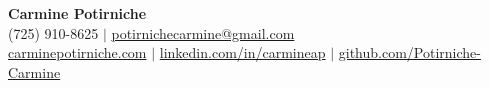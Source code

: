 \documentclass[letterpaper,11pt]{article}
\begin{document}
\begin{center}
    {\fontsize{25}{28}\selectfont\textbf{Carmine Potirniche}} \\[4pt]
    {\small (725) 910-8625 $|$
    \href{mailto:potirnichecarmine@gmail.com}{potirnichecarmine@gmail.com}} \\[2pt]
    {\small \href{https://carminepotirniche.com}{carminepotirniche.com} $|$
    \href{https://linkedin.com/in/carmineap}{linkedin.com/in/carmineap} $|$
    \href{https://github.com/Potirniche-Carmine}{github.com/Potirniche-Carmine}}
\end{center}
\vspace{-3pt}

\end{document}
